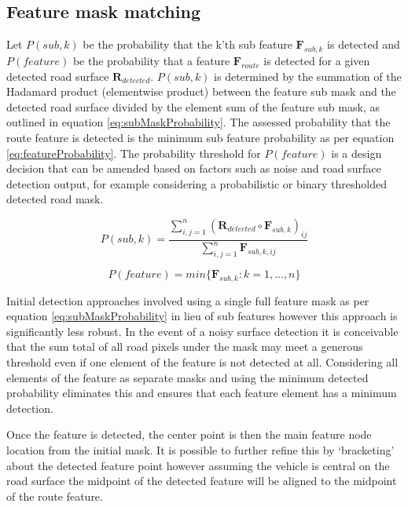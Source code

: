\documentclass[]{aiaa-tc}%
\begin{document}
\subsection{Feature mask matching} 

Let $P(sub,k)$ be the probability that the k'th sub feature $\textbf{F}_{sub,k}$ is detected and $P(feature)$ be the probability that a feature $\textbf{F}_{route}$ is detected for a given detected road surface $\textbf{R}_{detected}$. $P(sub,k)$ is determined by the summation of the Hadamard product (elementwise product) between the feature sub mask and the detected road surface divided by the element sum of the feature sub mask, as outlined in equation \ref{eq:subMaskProbability}. The assessed probability that the route feature is detected is the minimum sub feature probability as per equation \ref{eq:featureProbability}. The probability threshold for $P(feature)$ is a design decision that can be amended based on factors such as noise and road surface detection output, for example considering a probabilistic or binary thresholded detected road mask.

\begin{equation}\label{eq:subMaskProbability}
	P(sub,k) = \frac{\sum_{i,j=1}^{n} (\textbf{R}_{detected} \circ \textbf{F}_{sub,k})_{ij}}{\sum_{i,j=1}^{n} \textbf{F}_{sub,k,ij}}
\end{equation}

\begin{equation}\label{eq:featureProbability}
	P(feature) = min\{\textbf{F}_{sub,k}:k=1,...,n\}
\end{equation}

Initial detection approaches involved using a single full feature mask as per equation \ref{eq:subMaskProbability} in lieu of sub features however this approach is significantly less robust. In the event of a noisy surface detection it is conceivable that the sum total of all road pixels under the mask may meet a generous threshold even if one element of the feature is not detected at all. Considering all elements of the feature as separate masks and using the minimum detected probability eliminates this and ensures that each feature element has a minimum detection. 

Once the feature is detected, the center point is then the main feature node location from the initial mask. It is possible to further refine this by `bracketing' about the detected feature point however assuming the vehicle is central on the road surface the midpoint of the detected feature will be aligned to the midpoint of the route feature.
\end{document}
